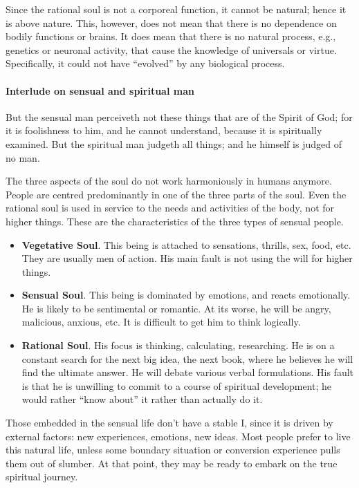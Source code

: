 Since the rational soul is not a corporeal function, it cannot be natural; hence it is above nature. This, however, does not mean that there is no dependence on bodily functions or brains. It does mean that there is no natural process, e.g., genetics or neuronal activity, that cause the knowledge of universals or virtue. Specifically, it could not have “evolved” by any biological process.

\paragraph{Interlude on sensual and spiritual man}
\begin{quotex}
But the sensual man perceiveth not these things that are of the Spirit of God; for it is foolishness to him, and he cannot understand, because it is spiritually examined. But the spiritual man judgeth all things; and he himself is judged of no man. 

\end{quotex}
The three aspects of the soul do not work harmoniously in humans anymore. People are centred predominantly in one of the three parts of the soul. Even the rational soul is used in service to the needs and activities of the body, not for higher things. These are the characteristics of the three types of sensual people.

\begin{itemize}
\item \textbf{Vegetative Soul}. This being is attached to sensations, thrills, sex, food, etc. They are usually men of action. His main fault is not using the will for higher things. 
\item \textbf{Sensual Soul}. This being is dominated by emotions, and reacts emotionally. He is likely to be sentimental or romantic. At its worse, he will be angry, malicious, anxious, etc. It is difficult to get him to think logically. 
\item \textbf{Rational Soul}. His focus is thinking, calculating, researching. He is on a constant search for the next big idea, the next book, where he believes he will find the ultimate answer. He will debate various verbal formulations. His fault is that he is unwilling to commit to a course of spiritual development; he would rather “know about” it rather than actually do it. 
\end{itemize}
Those embedded in the sensual life don't have a stable I, since it is driven by external factors: new experiences, emotions, new ideas. Most people prefer to live this natural life, unless some boundary situation or conversion experience pulls them out of slumber. At that point, they may be ready to embark on the true spiritual journey.

